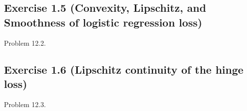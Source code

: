 \documentclass[
  10pt, %
  a4paper, %
  oneside, %
  headinclude,footinclude, %
  BCOR5mm, %
]{scrartcl}
\begin{document}
\subsection*{Exercise 1.5 (Convexity, Lipschitz, and Smoothness of logistic regression loss)}
Problem 12.2.

\subsection*{Exercise 1.6 (Lipschitz continuity of the hinge loss)}
Problem 12.3.


\end{document}
